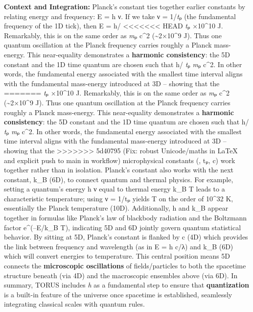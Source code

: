 \documentclass[]{article}
\begin{document}
\textbf{Context and Integration:} Planck's constant ties together
earlier constants by relating energy and frequency: E = h ν. If we take
ν = 1/\emph{t}ₚ (the fundamental frequency of the 1D tick), then E = h/
<<<<<<< HEAD
\emph{t}ₚ ×10\^{}10 J\hspace{0pt}. Remarkably, this is on the same
order as \emph{m}ₚ c\^{}2 (\textasciitilde2×10\^{}9 J)\hspace{0pt}. Thus
one quantum oscillation at the Planck frequency carries roughly a Planck
mass-energy. This near-equality demonstrates a \textbf{harmonic
consistency}: the 5D constant and the 1D time quantum are chosen such
that h/ \emph{t}ₚ \approx \emph{m}ₚ c\^{}2\hspace{0pt}. In other words, the
fundamental energy associated with the smallest time interval aligns
with the fundamental mass-energy introduced at 3D -- showing that the
=======
\emph{t}ₚ ×10\^{}10 J​. Remarkably, this is on the same order as
\emph{m}ₚ c\^{}2 (\textasciitilde{}2×10\^{}9 J)​. Thus one quantum
oscillation at the Planck frequency carries roughly a Planck
mass-energy. This near-equality demonstrates a \textbf{harmonic
consistency}: the 5D constant and the 1D time quantum are chosen such
that h/ \emph{t}ₚ \approx \emph{m}ₚ c\^{}2​. In other words, the fundamental
energy associated with the smallest time interval aligns with the
fundamental mass-energy introduced at 3D -- showing that the
>>>>>>> 5d40795 (Fix: robust Unicode/maths in LaTeX and explicit push to main in workflow)
microphysical constants (\hbar, tₚ, c) work together rather than in
isolation. Planck's constant also works with the next constant, k\_B
(6D), to connect quantum and thermal physics. For example, setting a
quantum's energy h ν equal to thermal energy k\_B T leads to a
characteristic temperature; using ν = 1/tₚ yields T on the order of
10\^{}32 K, essentially the Planck temperature (10D)​. Additionally, h
and k\_B appear together in formulas like Planck's law of blackbody
radiation and the Boltzmann factor e\^{}(--E/k\_B T), indicating 5D and
6D jointly govern quantum statistical behavior. By sitting at 5D,
Planck's constant is flanked by c (4D) which provides the link between
frequency and wavelength (as in E = h c/λ) and k\_B (6D) which will
convert energies to temperature​. This central position means 5D
connects the \textbf{microscopic oscillations} of fields/particles to
both the spacetime structure beneath (via 4D) and the macroscopic
ensembles above (via 6D). In summary, TORUS includes \emph{h} as a
fundamental step to ensure that \textbf{quantization} is a built-in
feature of the universe once spacetime is established, seamlessly
integrating classical scales with quantum rules.
\end{document}
